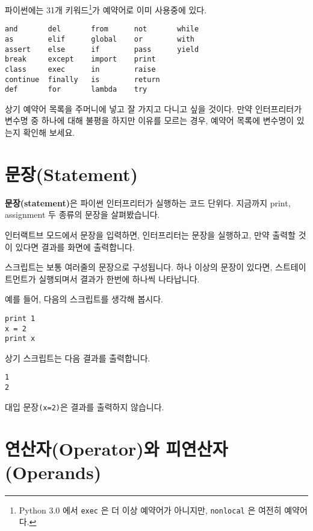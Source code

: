 
파이썬에는 31개 키워드\footnote{Python 3.0 에서 {\tt exec} 은 더 이상 예약어가 아니지만, {\tt nonlocal} 은 여전히 예약어다.}가 예약어로 이미 사용중에 있다.

\beforeverb
\begin{verbatim}
and       del       from      not       while    
as        elif      global    or        with     
assert    else      if        pass      yield    
break     except    import    print              
class     exec      in        raise              
continue  finally   is        return             
def       for       lambda    try
\end{verbatim}
\afterverb
%

상기 예약어 목록을 주머니에 넣고 잘 가지고 다니고 싶을 것이다. 
만약 인터프리터가 변수명 중 하나에 대해 불평을 하지만 이유를 모르는 경우, 예약어 목록에 변수명이 있는지 확인해 보세요.

\section{문장(Statement)}

{\bf 문장(statement)}은 파이썬 인터프리터가 실행하는 코드 단위다. 지금까지 print, assignment 두 종류의 문장을 살펴봤습니다.


인터랙트브 모드에서 문장을 입력하면, 인터프리터는 문장을 실행하고, 만약 출력할 것이 있다면 결과를 화면에 출력합니다.

스크립트는 보통 여러줄의 문장으로 구성됩니다. 하나 이상의 문장이 있다면, 스트테이트먼트가 실행되며서 결과가 한번에 하나씩 나타납니다.

예를 들어, 다음의 스크립트를 생각해 봅시다.

\beforeverb
\begin{verbatim}
print 1
x = 2
print x
\end{verbatim}
\afterverb
%

상기 스크립트는 다음 결과를 출력합니다.

\beforeverb
\begin{verbatim}
1
2
\end{verbatim}
\afterverb
%

대입 문장{\tt (x=2)}은 결과를 출력하지 않습니다.

\section{연산자(Operator)와 피연산자(Operands)}

